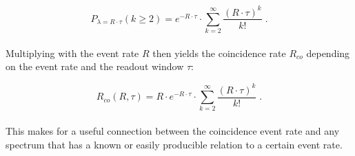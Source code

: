\begin{equation}
    P_{\lambda = R\cdot\tau}(k\geq2) = e^{- R\cdot\tau} \cdot \sum_{k=2}^\infty \frac{{(R\cdot\tau)}^k}{k!} \; .
\end{equation}\\ 

Multiplying with the event rate $R$ then yields the coincidence rate $R_{co}$ depending on the event rate and the readout window $\tau$:

\begin{equation}
    R_{co}(R,\tau) = R \cdot e^{- R\cdot\tau} \cdot \sum_{k=2}^\infty \frac{{(R\cdot\tau)}^k}{k!}\;.
    \label{eq:multi_rate}
\end{equation}\\

This makes for a useful connection between the coincidence event rate and any spectrum that has a known or easily producible relation to a certain event rate.




